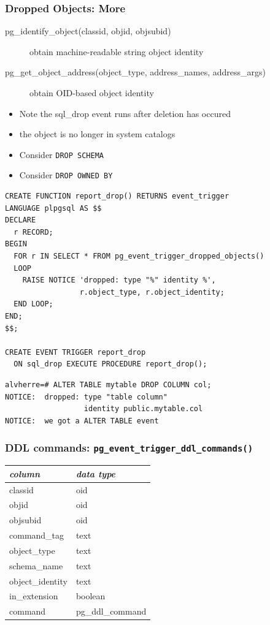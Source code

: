 \frame
{ \frametitle{Dropped Objects: More}

\begin{description}
	\item[pg\_identify\_object(classid, objid, objsubid)]
		obtain machine-readable string object identity

	\item[pg\_get\_object\_address(object\_type, address\_names, address\_args)]
		obtain OID-based object identity
\end{description}

\begin{itemize}
\item Note the sql\_drop event runs after deletion has occured
\item the object is no longer in system catalogs
\item Consider \texttt{DROP SCHEMA}
\item Consider \texttt{DROP OWNED BY}
 \end{itemize}
}

\begin{frame}[fragile]

\begin{lstlisting}
CREATE FUNCTION report_drop() RETURNS event_trigger
LANGUAGE plpgsql AS $$
DECLARE
  r RECORD;
BEGIN
  FOR r IN SELECT * FROM pg_event_trigger_dropped_objects()
  LOOP
    RAISE NOTICE 'dropped: type "%" identity %',
                 r.object_type, r.object_identity;
  END LOOP;
END;
$$;

CREATE EVENT TRIGGER report_drop
  ON sql_drop EXECUTE PROCEDURE report_drop();
\end{lstlisting}
\end{frame}

\begin{frame}[fragile]
\begin{lstlisting}
alvherre=# ALTER TABLE mytable DROP COLUMN col;
NOTICE:  dropped: type "table column"
                  identity public.mytable.col
NOTICE:  we got a ALTER TABLE event
\end{lstlisting}

\end{frame}

\frame
{ \frametitle{DDL commands: \texttt{pg\_event\_trigger\_ddl\_commands()}}

\begin{tabular}{l | l}
\textit{column} & \textit{data type} \\ \hline
classid & oid \\
objid & oid \\
objsubid & oid \\
command\_tag & text \\
object\_type & text \\
schema\_name & text \\
object\_identity & text \\
in\_extension & boolean \\
command & pg\_ddl\_command \\
\end{tabular}

}


